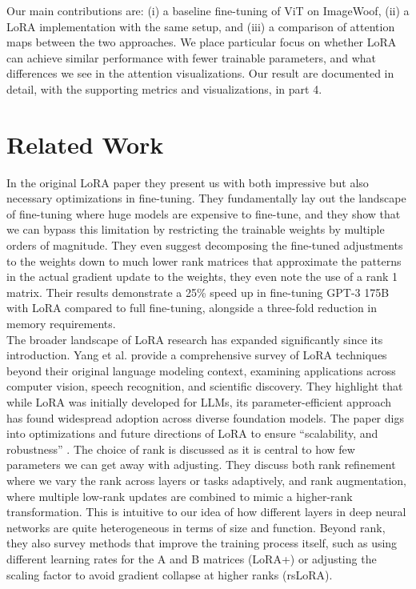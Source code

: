 \documentclass[10pt]{article}
\begin{document}
Our main contributions are: (i) a baseline fine-tuning of ViT on ImageWoof, (ii) a LoRA implementation with the same setup, and (iii) a comparison of attention maps between the two approaches. We place particular focus on whether LoRA can achieve similar performance with fewer trainable parameters, and what differences we see in the attention visualizations. Our result are documented in detail, with the supporting metrics and visualizations, in part 4.

\section{Related Work}
In the original LoRA paper \cite{hu2021loralowrankadaptationlarge} they present us with both impressive but also necessary optimizations in fine-tuning. They fundamentally lay out the landscape of fine-tuning where huge models are expensive to fine-tune, and they show that we can bypass this limitation by restricting the trainable weights by multiple orders of magnitude. They even suggest decomposing the fine-tuned adjustments to the weights down to much lower rank matrices that approximate the patterns in the actual gradient update to the weights, they even note the use of a rank 1 matrix. Their results demonstrate a 25\% speed up in fine-tuning GPT-3 175B with LoRA compared to full fine-tuning, alongside a three-fold reduction in memory requirements.\\

The broader landscape of LoRA research has expanded significantly since its introduction. Yang et al. \cite{yang2024lowrankadaptationfoundationmodels} provide a comprehensive survey of LoRA techniques beyond their original language modeling context, examining applications across computer vision, speech recognition, and scientific discovery. They highlight that while LoRA was initially developed for LLMs, its parameter-efficient approach has found widespread adoption across diverse foundation models. The paper digs into optimizations and future directions of LoRA to ensure “scalability, and robustness” \cite{yang2024lowrankadaptationfoundationmodels}. The choice of rank is discussed as it is central to how few parameters we can get away with adjusting. They discuss both rank refinement where we vary the rank across layers or tasks adaptively, and rank augmentation, where multiple low-rank updates are combined to mimic a higher-rank 
transformation. This is intuitive to our idea of how different layers in deep neural networks are quite heterogeneous in terms of size and function. Beyond rank, they also survey methods that improve the training process itself, such as using different learning rates for the A and B matrices (LoRA+) or adjusting the scaling factor to avoid gradient collapse at higher ranks (rsLoRA).
\end{document}
